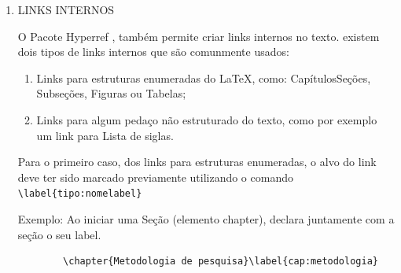 \begin{enumerate}
	O seguinte exemplo apresenta a criação de uma equação com uma descrição detalhada e uma referencia usando o comando \verb|\eqref{label}|.

	\begin{verbatim}
		Essa métrica é estabelecida pela equação
		~\eqref{eq:diferenca_percentual}, onde \(DP\)
		é a Diferença Percentual, \(T_p\) é o Tempo em Paralelo
		e \(T_s\) é o Tempo Serial.

		\begin{equation}
			DP = (T_p - T_s) / T_s * 100
			\label{eq:diferenca_percentual}
		\end{equation}
	\end{verbatim}


	O reultado é apresentado a seguir:

	Essa métrica é estabelecida pela equação~\eqref{eq:diferenca_percentual}, onde \(DP\) é a Diferença Percentual, \(T_p\) é o Tempo em Paralelo e \(T_s\) é o Tempo Serial.

	\begin{equation}
		DP = (T_p - T_s) / T_s * 100
		\label{eq:diferenca_percentual}
	\end{equation}

	\item \MakeUppercase{Links Internos}

	O Pacote Hyperref \cite{hyperref_package}, também permite criar links internos no texto. existem dois tipos de links internos que são comunmente usados:

	\begin{enumerate}[label=\arabic*)] %
		\item Links para estruturas enumeradas do \LaTeX, como: CapítulosSeções, Subseções, Figuras ou Tabelas;
		\item Links para algum pedaço não estruturado do texto, como por exemplo um link para Lista de siglas.
	\end{enumerate}

	Para o primeiro caso, dos links para estruturas enumeradas, o alvo do link deve ter sido marcado previamente utilizando o comando \verb|\label{tipo:nomelabel}|

	Exemplo: Ao iniciar uma Seção (elemento chapter), declara juntamente com a seção o seu label.

	\begin{verbatim}
		\chapter{Metodologia de pesquisa}\label{cap:metodologia}
	\end{verbatim}


\end{enumerate}
